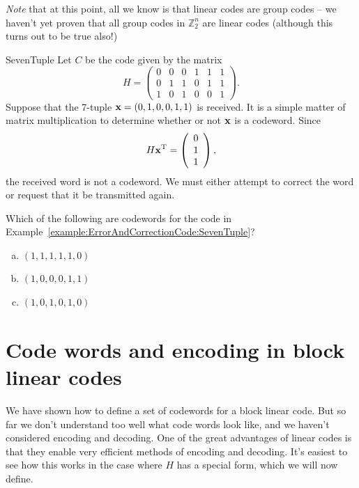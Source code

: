  \noindent
\emph{Note} that at this point, all we know is that linear codes are group codes -- we haven't yet proven that all group codes in $\mathbb{Z}_2^n$ are linear codes (although this turns out to be true also!)
 
\begin{example}{SevenTuple}
Let $C$ be the code given by the matrix
\[
H =
\left(
\begin{array}{cccccc}
0 & 0 & 0 & 1 & 1 & 1 \\
0 & 1 & 1 & 0 & 1 & 1 \\
1 & 0 & 1 & 0 & 0 & 1
\end{array}
\right).
\]
Suppose that the 7-tuple ${\bold x} = (0,1,0,0,1,1)$ is received.
It is a simple matter of matrix multiplication to determine whether or
not ${\bold x}$ is a codeword. Since 
\[
H{\bold x}^{\mathrm{T}} =
\left(
\begin{array}{c}
0 \\
1 \\
1
\end{array}
\right),
\]
the received word is not a codeword.  We must either attempt to
correct the word or request that it be transmitted again.
\end{example}

\begin{exercise}{}
Which of the following are codewords for the code in Example~\ref{example:ErrorAndCorrectionCode:SevenTuple}?
\begin{enumerate}[(a)]
\item
$(1,1,1,1,1,0)$
\item
$(1,0,0,0,1,1)$
\item
$(1,0,1,0,1,0)$
\end{enumerate}
\end{exercise}


 
\section{Code words and encoding in block linear codes}
\label{sec:ErrorAndCorrectionCode:EncodingBlockLinearCodes}
 
We have shown how to define a set of codewords for a block linear code. But so far we don't understand too well what code words look like, and we haven't considered encoding and decoding. One of the great advantages of linear codes is that they enable  very efficient methods of encoding and decoding.  It's easiest to see how this works in the case where $H$ has a special form, which we will now define.

